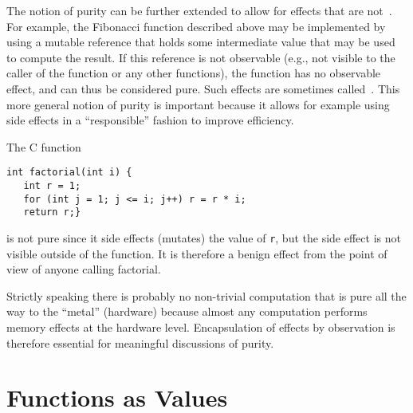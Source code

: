 \begin{flex}

  \begin{gram}
The notion of purity can be further extended to allow for effects
that are not~.  
%
For example, the Fibonacci function
described above may be implemented by using a mutable reference that
holds some intermediate value that may be used to compute
the result.
%
If this reference is not observable (e.g., not visible to the caller
of the function or any other functions), the function has no observable
effect, and can thus be considered pure.  Such effects are sometimes
called~.
%
This more general notion of purity is important because it allows for
example using side effects in a ``responsible'' fashion to improve
efficiency.
\end{gram}

\begin{example}
The C function 
\begin{verbatim}
int factorial(int i) {
   int r = 1;
   for (int j = 1; j <= i; j++) r = r * i;
   return r;}
\end{verbatim}
is not pure since it side effects (mutates) the value of \texttt{r}, but the
side effect is not visible outside of the function.   It is therefore
a benign effect from the point of view of anyone calling factorial.
\end{example}
\end{flex}

\begin{important}
Strictly speaking there is probably no non-trivial computation that is
pure all the way to the ``metal'' (hardware) because almost any computation performs memory effects at the
hardware level.  Encapsulation of effects by observation is therefore
essential for meaningful discussions of purity.
\end{important}

\section{Functions as Values}

